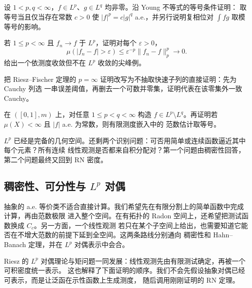 \begin{exercise}\label{exercise:3-3-2-1}
设 $1<p,q<\infty$，$f\in L^p$、$g\in L^q$ 均非零。沿 Young 不等式的等号条件证明：
\Holder{} 取等号当且仅当存在常数 $c>0$ 使 $|f|^p=c|g|^q$ a.e.，并另行说明复相位对
$\int fg$ 取模等号的影响。
\end{exercise}

\begin{exercise}[$L^p$ 收敛与依测度收敛]\label{exercise:3-3-2-2}
若 $1\le p<\infty$ 且 $f_n\to f$ 于 $L^p$，证明对每个 $\varepsilon>0$，
\[
 \mu(|f_n-f|>\varepsilon)
 \le\varepsilon^{-p}\|f_n-f\|_p^p\longrightarrow0.
\]
给出一个依测度收敛但不在 $L^p$ 收敛的尖峰例。
\end{exercise}

\begin{exercise}\label{exercise:3-3-2-3}
把 Riesz--Fischer 定理的 $p=\infty$ 证明改写为不抽取快速子列的直接证明：先为 Cauchy 列选
一串误差阈值，再删去一个可数并零集，证明代表在该零集外一致 Cauchy。
\end{exercise}

\begin{exercise}[有限测度中的严格性]\label{exercise:3-3-2-4}
在 $([0,1],m)$ 上，对任意 $1\le p<q<\infty$ 构造
$f\in L^p\setminus L^q$。再证明若 $\mu(X)<\infty$ 且 $|f|$ a.e. 为常数，则有限测度嵌入中的
范数估计取等号。
\end{exercise}

$L^p$ 已经是完备的几何空间。还剩两个识别问题：可否用简单或连续函数逼近其中每个元素？所有连续
线性观测是否都来自积分配对？第一个问题由稠密性回答，第二个问题最终又回到 RN 密度。


\subsection{稠密性、可分性与 \texorpdfstring{$L^p$}{Lp} 对偶}\label{subsec:3-3-3}

抽象的 a.e. 等价类不适合直接计算。我们希望先在有限分割上的简单函数中完成计算，再由范数极限
进入整个空间。在有拓扑的 Radon 空间上，还希望把测试函数换成 $C_c$。另一方面，一个线性观测
若只在某个子空间上给出，也需要知道它能否在不增大范数的前提下延到全空间。这两条路线分别通向
稠密性和 Hahn--Banach 定理，并在 $L^p$ 对偶表示中会合。

Riesz 的 $L^p$ 对偶理论与矩问题一同发展：线性观测先由有限测试确定，再被一个可积密度统一表示。
这也解释了下面证明的顺序。我们不会先假设抽象对偶已经可表示，而是让泛函在示性函数上生成测度，
随后调用刚刚证明的 RN 定理。


